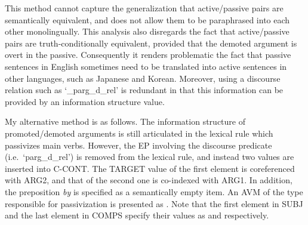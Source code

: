 \noindent This method cannot capture the generalization that
active/passive pairs are semantically equivalent, and does not allow
them to be paraphrased into each other monolingually. This analysis
also disregards the fact that active/passive pairs are
truth-conditionally equivalent, provided that the
demoted argument is overt in the passive. Consequently it
renders problematic the fact that passive sentences in English
sometimes need to be translated into active sentences in other
languages, such as Japanese and Korean. Moreover, using a discourse
relation such as `\_parg\_d\_rel' is redundant in that this
information can be provided by an information structure value.



My alternative method is as follows. The information structure of
promoted/demoted arguments is still articulated in the lexical rule
which passivizes main verbs. However, the EP involving the discourse
predicate (i.e.\ `parg\_d\_rel') is removed from the lexical rule, and
instead two  values are inserted into
C-CONT. The TARGET value of the first element is
coreferenced with ARG2, and that of the second one is co-indexed with
ARG1.  In addition, the preposition \textit{by} is specified as a
semantically empty item. An AVM of the type responsible
for passivization is presented as . Note that the
first element in SUBJ and the last element in COMPS specify their
 values as  and 
respectively.






